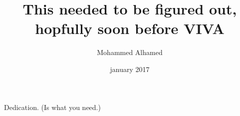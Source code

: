 \documentclass[oneside,hidelinks]{glasgowthesis}
\begin{document}
\pagestyle{empty}

\title{This needed to be figured out, hopfully soon before VIVA}
\author{Mohammed Alhamed}
\date{january 2017}

\maketitle

\cleardoublepage

 

\newpage
 

\cleardoublepage
\vspace*{1.75in}
\begin{flushright} Dedication. (Is what you need.)\end{flushright}








\tableofcontents
\listoftables
\listoffigures

\cleardoublepage
\pagestyle{fancy}
\setcounter{page}{1}
\end{document}
